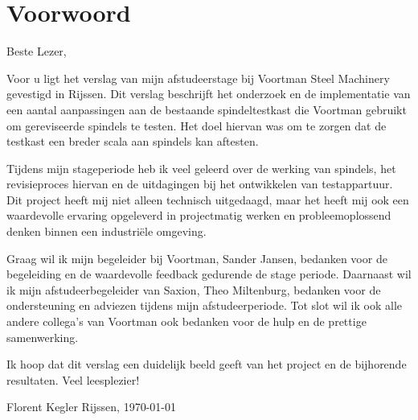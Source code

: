 \section*{Voorwoord}

Beste Lezer,
\vspace{0.5cm}

Voor u ligt het verslag van mijn afstudeerstage bij Voortman Steel Machinery gevestigd in Rijssen. Dit verslag beschrijft het onderzoek en de implementatie van een aantal aanpassingen aan de bestaande spindeltestkast die Voortman gebruikt om gereviseerde spindels te testen. Het doel hiervan was om te zorgen dat de testkast een breder scala aan spindels kan aftesten.

\vspace{0.5cm}

Tijdens mijn stageperiode heb ik veel geleerd over de werking van spindels, het revisieproces hiervan en de uitdagingen bij het ontwikkelen van testappartuur. Dit project heeft mij niet alleen technisch uitgedaagd, maar het heeft mij ook een waardevolle ervaring opgeleverd in projectmatig werken en probleemoplossend denken binnen een industriële omgeving.

\vspace{0.5cm}

Graag wil ik mijn begeleider bij Voortman, Sander Jansen, bedanken voor de begeleiding en de waardevolle feedback gedurende de stage periode. Daarnaast wil ik mijn afstudeerbegeleider van Saxion, Theo Miltenburg, bedanken voor de ondersteuning en adviezen tijdens mijn afstudeerperiode. Tot slot wil ik ook alle andere collega's van Voortman ook bedanken voor de hulp en de prettige samenwerking.

\vspace{0.5cm}

Ik hoop dat dit verslag een duidelijk beeld geeft van het project en de bijhorende resultaten. Veel leesplezier!

\vspace{0.5cm}

Florent Kegler
\newline
Rijssen, \today